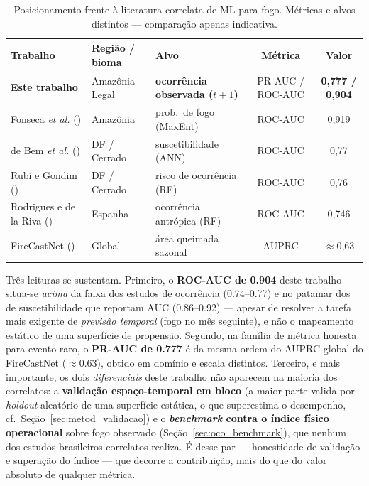 \begin{table}[h]
\centering
\caption{Posicionamento frente à literatura correlata de ML para fogo. Métricas e alvos
distintos --- comparação apenas indicativa.}
\label{tab:oco_posicionamento}
\small
\begin{tabular}{p{4.2cm}p{2.6cm}p{3.1cm}cc}
\toprule
\textbf{Trabalho} & \textbf{Região / bioma} & \textbf{Alvo} & \textbf{Métrica} & \textbf{Valor} \\
\midrule
\textbf{Este trabalho} & Amazônia Legal & \textbf{ocorrência observada (\(t+1\))} & PR-AUC / ROC-AUC & \textbf{0,777 / 0,904} \\
Fonseca \emph{et al.} (\citeyear{fonseca2016maxent}) & Amazônia & prob.\ de fogo (MaxEnt) & ROC-AUC & 0,919 \\
de Bem \emph{et al.} (\citeyear{debem2019vulnerability}) & DF / Cerrado & suscetibilidade (ANN) & ROC-AUC & 0,77 \\
Rubí e Gondim (\citeyear{rubi2024performance}) & DF / Cerrado & risco de ocorrência (RF) & ROC-AUC & 0,76 \\
Rodrigues e de la Riva (\citeyear{rodrigues2014insight}) & Espanha & ocorrência antrópica (RF) & ROC-AUC & 0,746 \\
FireCastNet (\citeyear{karasante2025firecastnet}) & Global & área queimada sazonal & AUPRC & \(\approx\)0,63 \\
\bottomrule
\end{tabular}
\end{table}

Três leituras se sustentam. Primeiro, o \textbf{ROC-AUC de \num{0,904}} deste trabalho situa-se
\emph{acima} da faixa dos estudos de ocorrência (\numrange{0,74}{0,77}) e no patamar dos de
suscetibilidade que reportam AUC (\numrange{0,86}{0,92}) --- apesar de resolver a tarefa mais
exigente de \emph{previsão temporal} (fogo no mês seguinte), e não o mapeamento estático de uma
superfície de propensão. Segundo, na família de métrica honesta para evento raro, o
\textbf{PR-AUC de \num{0,777}} é da mesma ordem do AUPRC global do FireCastNet
(\(\approx\)\num{0,63}), obtido em domínio e escala distintos. Terceiro, e mais importante, os
dois \emph{diferenciais} deste trabalho não aparecem na maioria dos correlatos: a
\textbf{validação espaço-temporal em bloco} (a maior parte valida por \emph{holdout}
aleatório de uma superfície estática, o que superestima o desempenho, cf.\
Seção~\ref{sec:metod_validacao}) e o \textbf{\emph{benchmark} contra o índice físico operacional}
sobre fogo observado (Seção~\ref{sec:oco_benchmark}), que nenhum dos estudos brasileiros
correlatos realiza. É desse par --- honestidade de validação e superação do índice --- que
decorre a contribuição, mais do que do valor absoluto de qualquer métrica.

